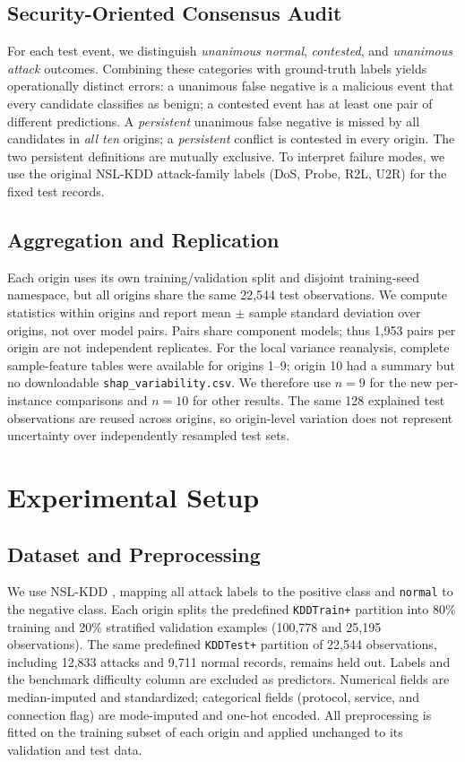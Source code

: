 \documentclass[10pt,conference]{IEEEtran}
\begin{document}
\subsection{Security-Oriented Consensus Audit}
For each test event, we distinguish \emph{unanimous normal}, \emph{contested}, and \emph{unanimous attack} outcomes. Combining these categories with ground-truth labels yields operationally distinct errors: a unanimous false negative is a malicious event that every candidate classifies as benign; a contested event has at least one pair of different predictions. A \emph{persistent} unanimous false negative is missed by all candidates in \emph{all ten} origins; a \emph{persistent} conflict is contested in every origin. The two persistent definitions are mutually exclusive. To interpret failure modes, we use the original NSL-KDD attack-family labels (DoS, Probe, R2L, U2R) for the fixed test records.

\subsection{Aggregation and Replication}
Each origin uses its own training/validation split and disjoint training-seed namespace, but all origins share the same 22,544 test observations. We compute statistics within origins and report mean $\pm$ sample standard deviation over origins, not over model pairs. Pairs share component models; thus 1,953 pairs per origin are not independent replicates. For the local variance reanalysis, complete sample-feature tables were available for origins 1--9; origin 10 had a summary but no downloadable \texttt{shap\_variability.csv}. We therefore use $n=9$ for the new per-instance comparisons and $n=10$ for other results. The same 128 explained test observations are reused across origins, so origin-level variation does not represent uncertainty over independently resampled test sets.

\section{Experimental Setup}
\subsection{Dataset and Preprocessing}
We use NSL-KDD \cite{tavallaee2009}, mapping all attack labels to the positive class and \texttt{normal} to the negative class. Each origin splits the predefined \texttt{KDDTrain+} partition into 80\% training and 20\% stratified validation examples (100,778 and 25,195 observations). The same predefined \texttt{KDDTest+} partition of 22,544 observations, including 12,833 attacks and 9,711 normal records, remains held out. Labels and the benchmark difficulty column are excluded as predictors. Numerical fields are median-imputed and standardized; categorical fields (protocol, service, and connection flag) are mode-imputed and one-hot encoded. All preprocessing is fitted on the training subset of each origin and applied unchanged to its validation and test data.
\end{document}
